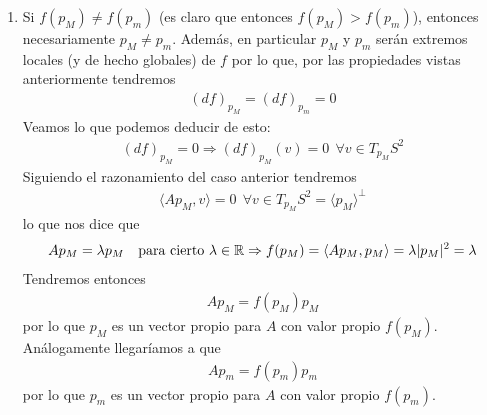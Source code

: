 \begin{ejercicio}
\begin{enumerate}
\begin{enumerate}
            \item Si $f(p_M)\neq f(p_m)$ (es claro que entonces $f(p_M)>f(p_m)$), entonces necesariamente $p_M\neq p_m$. Además, en particular $p_M$ y $p_m$ serán extremos locales (y de hecho globales) de $f$ por lo que, por las propiedades vistas anteriormente tendremos
            \begin{gather*}
                (df)_{p_M} = (df)_{p_m} = 0
            \end{gather*}
            Veamos lo que podemos deducir de esto:
            \begin{gather*}
                (df)_{p_M} = 0 \Rightarrow (df)_{p_M}(v) = 0 \ \ \forall v \in T_{p_M}S^2 
            \end{gather*}
            Siguiendo el razonamiento del caso anterior tendremos
            \begin{gather*}
                \langle Ap_M, v\rangle = 0 \ \ \forall v \in T_{p_M}S^2= \langle p_M \rangle^\bot
            \end{gather*}
            lo que nos dice que 
            \begin{gather*}
                Ap_M = \lambda p_M\ \ \text{ para cierto } \lambda\in \mathbb{R} \Rightarrow f(p_M)= \langle Ap_M, p_M \rangle = \lambda |p_M|^2 = \lambda
            \end{gather*}
            Tendremos entonces
            \begin{gather*}
                Ap_M = f(p_M)p_M
            \end{gather*}
            por lo que $p_M$ es un vector propio para $A$ con valor propio $f(p_M)$. \\
            
            Análogamente llegaríamos a que 
            \begin{gather*}
                Ap_m = f(p_m)p_m
            \end{gather*}
            por lo que $p_m$ es un vector propio para $A$ con valor propio $f(p_m)$.\\
            

\end{enumerate}
\end{enumerate}
\end{ejercicio}
